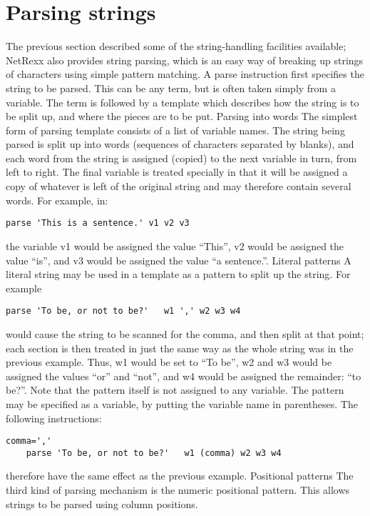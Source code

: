 \section{Parsing strings}
The previous section described some of the string-handling facilities available; NetRexx also provides string parsing, which is an easy way of breaking up strings of characters using simple pattern matching.
A parse instruction first specifies the string to be parsed. This can be any term, but is often taken simply from a variable. The term is followed by a template which describes how the string is to be split up, and where the pieces are to be put.
Parsing into words
The simplest form of parsing template consists of a list of variable
names. The string being parsed is split up into words (sequences of
characters separated by blanks), and each word from the string is
assigned (copied) to the next variable in turn, from left to
right. The final variable is treated specially in that it will be
assigned a copy of whatever is left of the original string and may
therefore contain several words. For example, in:
\begin{lstlisting}[label=parsingstrings,caption=Parsing Strings]
parse 'This is a sentence.' v1 v2 v3
\end{lstlisting}
the variable v1 would be assigned the value “This”, v2 would be assigned the value
“is”, and v3 would be assigned the value “a sentence.”.
Literal patterns
A literal string may be used in a template as a pattern to split up
the string. For example
\begin{lstlisting}[label=parse,caption=Parse]
    parse 'To be, or not to be?'   w1 ',' w2 w3 w4
\end{lstlisting}
would cause the string to be scanned for the comma, and then split at that point; each section is then treated in just the same way as the whole string was in the previous example.
Thus, w1 would be set to “To be”, w2 and w3 would be assigned the values “or” and “not”, and w4 would be assigned the remainder: “to be?”. Note that the pattern itself is not assigned to any variable.
The pattern may be specified as a variable, by putting the variable
name in parentheses. The following instructions:
\begin{lstlisting}[label=comma,caption=Parse with comma]
    comma=','
    parse 'To be, or not to be?'   w1 (comma) w2 w3 w4
\end{lstlisting}
therefore have the same effect as the previous example.
Positional patterns
The third kind of parsing mechanism is the numeric positional pattern. This allows strings to be parsed using column positions.
